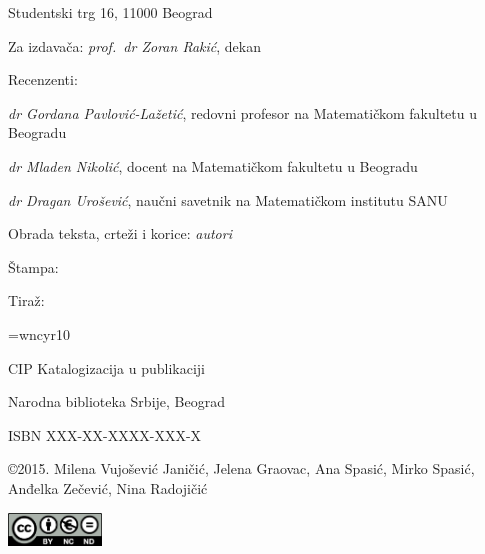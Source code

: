 Studentski trg 16, 11000 Beograd

\noindent
Za izdava\v{c}a: {\slshape prof.~dr Zoran Rakić}, dekan
\vspace*{3mm}

\noindent
Recenzenti:

\noindent
{\slshape dr Gordana Pavlović-Lažetić}, redovni profesor na Matematičkom fakultetu u Beogradu

\noindent
{\slshape dr Mladen Nikolić}, docent na Matematičkom fakultetu u Beogradu

\noindent
{\slshape dr Dragan Urošević}, naučni savetnik na Matematičkom institutu SANU
\vspace*{3mm}

\noindent
Obrada teksta, crteži i korice: {\slshape autori}


\ifstampanaverzija
\noindent
Štampa: %

\noindent
Tiraž: %
\vspace*{3mm}


\font\cyr=wncyr10

\ifstampanaverzija

\noindent
CIP {\cyr Katalogizacija u publikaciji} 

\noindent
{\cyr Narodna biblioteka Srbije, Beograd}
\vspace*{1mm}

\else 
  \noindent ISBN XXX-XX-XXXX-XXX-X \vspace*{1cm}
\fi



\noindent
\copyright 2015. Milena Vujošević Janičić, Jelena Graovac, Ana Spasić, Mirko Spasić, Anđelka Zečević, Nina Radojičić



\vspace*{1mm}
\noindent\includegraphics[width=2.5cm]{cc.png}

\newpage
